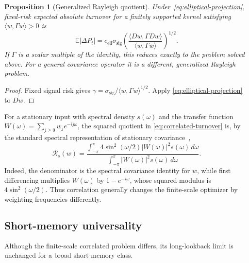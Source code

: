 \documentclass[11pt]{article}
\newtheorem{proposition}[theorem]{Proposition}
\theoremstyle{definition}
\theoremstyle{remark}
\newcommand{\Rcal}{\mathcal R}
\begin{document}
\begin{proposition}[Generalized Rayleigh quotient]\label{prop:generalized-rayleigh}
Under~\eqref{eq:elliptical-projection}, fixed-risk expected absolute turnover
for a finitely supported kernel satisfying
$\langle w,\Gamma w\rangle>0$ is
\begin{equation}\label{eq:correlated-turnover}
 \mathbb E|\Delta P_t|
 =c_{\mathrm{ell}}\sigma_{\mathrm{sig}}
 \left(
     \frac{\langle Dw,\Gamma Dw\rangle}
                {\langle w,\Gamma w\rangle}
 \right)^{1/2}.
\end{equation}
If $\Gamma$ is a scalar multiple of the identity, this reduces exactly to the
problem solved above. For a general covariance operator it is a different,
generalized Rayleigh problem.
\end{proposition}
\begin{proof}
Fixed signal risk gives
$\gamma=\sigma_{\mathrm{sig}}/
\langle w,\Gamma w\rangle^{1/2}$. Apply
\eqref{eq:elliptical-projection} to $Dw$.
\end{proof}

For a stationary input with spectral density $s(\omega)$ and the transfer
function $W(\omega)=\sum_{j\geq0}w_je^{-ij\omega}$, the squared quotient in
\eqref{eq:correlated-turnover} is, by the standard spectral representation of
stationary covariance~\cite{BrockwellDavis},
\begin{equation}\label{eq:spectral-rayleigh}
 \Rcal_s(w)=
 \frac{\displaystyle
     \int_{-\pi}^{\pi}4\sin^2(\omega/2)|W(\omega)|^2s(\omega)\,d\omega}
 {\displaystyle
     \int_{-\pi}^{\pi}|W(\omega)|^2s(\omega)\,d\omega}.
\end{equation}
Indeed, the denominator is the spectral covariance identity for $w$, while
first differencing multiplies $W(\omega)$ by $1-e^{-i\omega}$, whose squared
modulus is $4\sin^2(\omega/2)$.
Thus correlation generally changes the finite-scale optimizer by weighting
frequencies differently.

\subsection{Short-memory universality}
Although the finite-scale correlated problem differs, its long-lookback limit
is unchanged for a broad short-memory class.
\end{document}
